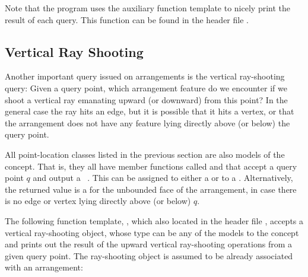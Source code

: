 
Note that the program uses the auxiliary
 function template to nicely print the
result of each query. This function can be found in the header file
.

\subsection{Vertical Ray Shooting\label{arr_ssec:ray_shoot}}

Another important query issued on arrangements is the vertical
ray-shooting query: Given a query point, which arrangement feature
do we encounter if we shoot a vertical ray emanating upward (or
downward) from this point? In the general case the ray hits an
edge, but it is possible that it hits a vertex, or that the
arrangement does not have any feature lying directly above (or
below) the query point.

All point-location classes listed in the previous section are also models
of the  concept. That is, they all
have member functions called  and
 that accept a query point $q$ and output a
\cgal\ . This can be assigned to either a
 or to a .
Alternatively, the returned value is a 
for the unbounded face of the arrangement, in case there is no edge
or vertex lying directly above (or below) $q$.

The following function template, ,
which also located in the header file ,
accepts a vertical ray-shooting
object, whose type can be any of the models to the
 concept and prints out the
result of the upward vertical ray-shooting operations from a given
query point. The ray-shooting object  is assumed to be
already associated with an arrangement:

